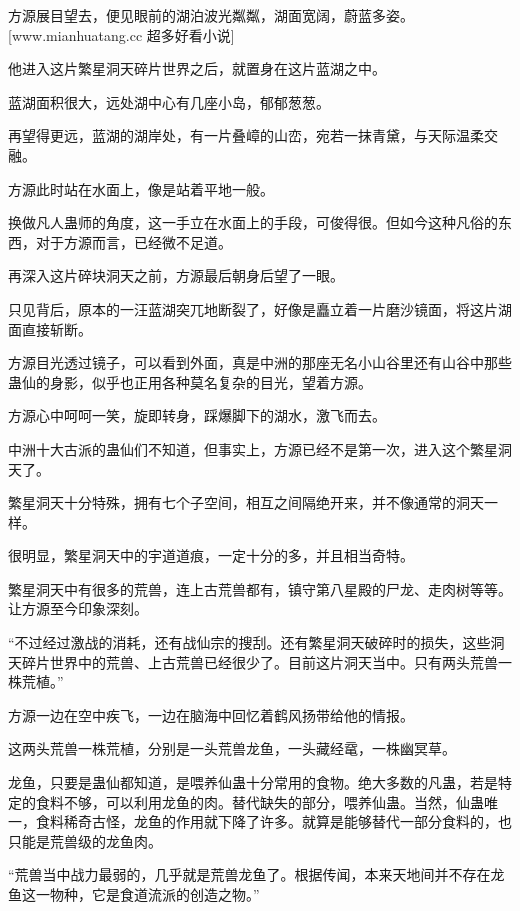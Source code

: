 
\begin{this_body}

方源展目望去，便见眼前的湖泊波光粼粼，湖面宽阔，蔚蓝多姿。[www.mianhuatang.cc 超多好看小说]

他进入这片繁星洞天碎片世界之后，就置身在这片蓝湖之中。

蓝湖面积很大，远处湖中心有几座小岛，郁郁葱葱。

再望得更远，蓝湖的湖岸处，有一片叠嶂的山峦，宛若一抹青黛，与天际温柔交融。

方源此时站在水面上，像是站着平地一般。

换做凡人蛊师的角度，这一手立在水面上的手段，可俊得很。但如今这种凡俗的东西，对于方源而言，已经微不足道。

再深入这片碎块洞天之前，方源最后朝身后望了一眼。

只见背后，原本的一汪蓝湖突兀地断裂了，好像是矗立着一片磨沙镜面，将这片湖面直接斩断。

方源目光透过镜子，可以看到外面，真是中洲的那座无名小山谷里还有山谷中那些蛊仙的身影，似乎也正用各种莫名复杂的目光，望着方源。

方源心中呵呵一笑，旋即转身，踩爆脚下的湖水，激飞而去。

中洲十大古派的蛊仙们不知道，但事实上，方源已经不是第一次，进入这个繁星洞天了。

繁星洞天十分特殊，拥有七个子空间，相互之间隔绝开来，并不像通常的洞天一样。

很明显，繁星洞天中的宇道道痕，一定十分的多，并且相当奇特。

繁星洞天中有很多的荒兽，连上古荒兽都有，镇守第八星殿的尸龙、走肉树等等。让方源至今印象深刻。

“不过经过激战的消耗，还有战仙宗的搜刮。还有繁星洞天破碎时的损失，这些洞天碎片世界中的荒兽、上古荒兽已经很少了。目前这片洞天当中。只有两头荒兽一株荒植。”

方源一边在空中疾飞，一边在脑海中回忆着鹤风扬带给他的情报。

这两头荒兽一株荒植，分别是一头荒兽龙鱼，一头藏经鼋，一株幽冥草。

龙鱼，只要是蛊仙都知道，是喂养仙蛊十分常用的食物。绝大多数的凡蛊，若是特定的食料不够，可以利用龙鱼的肉。替代缺失的部分，喂养仙蛊。当然，仙蛊唯一，食料稀奇古怪，龙鱼的作用就下降了许多。就算是能够替代一部分食料的，也只能是荒兽级的龙鱼肉。

“荒兽当中战力最弱的，几乎就是荒兽龙鱼了。根据传闻，本来天地间并不存在龙鱼这一物种，它是食道流派的创造之物。”


\end{this_body}
